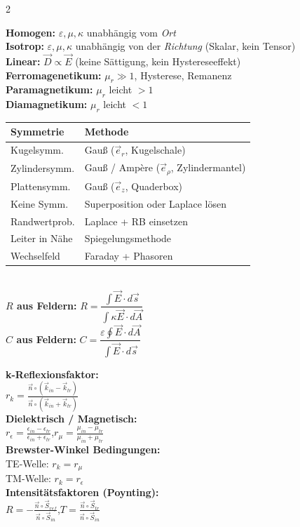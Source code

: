\documentclass[a4paper, 7.5pt]{extarticle}
\begin{document}
\begin{multicols*}{2}
\begin{tcolorbox}[title={Materialeigenschaften -- Definitionen}]
\textbf{Homogen:} $\varepsilon, \mu, \kappa$ unabhängig vom \textit{Ort}\\
\textbf{Isotrop:} $\varepsilon, \mu, \kappa$ unabhängig von der \textit{Richtung} (Skalar, kein Tensor)\\
\textbf{Linear:} $\vec{D}\propto\vec{E}$ (keine Sättigung, kein Hystereseeffekt)\\
\textbf{Ferromagenetikum:} $\mu_r\gg1$, Hysterese, Remanenz\\
\textbf{Paramagnetikum:} $\mu_r$ leicht $>1$\\
\textbf{Diamagnetikum:} $\mu_r$ leicht $<1$
\end{tcolorbox}

\begin{tcolorbox}[title={Lösungsstrategien -- Schnellübersicht}]
\begin{tabular}{@{}ll@{}}
\toprule
Symmetrie & Methode\\
\midrule
Kugelsymm. & Gauß ($\vec{e}_r$, Kugelschale)\\
Zylindersymm. & Gauß / Ampère ($\vec{e}_\rho$, Zylindermantel)\\
Plattensymm. & Gauß ($\vec{e}_z$, Quaderbox)\\
Keine Symm. & Superposition oder Laplace lösen\\
Randwertprob. & Laplace + RB einsetzen\\
Leiter in Nähe & Spiegelungsmethode\\
Wechselfeld & Faraday + Phasoren\\
\bottomrule
\end{tabular}\\[3pt]
\textbf{$R$ aus Feldern:}
$R = \dfrac{\int\vec{E}\cdot d\vec{s}}{\int\kappa\vec{E}\cdot d\vec{A}}$\\[3pt]
\textbf{$C$ aus Feldern:}
$C = \dfrac{\varepsilon\oint\vec{E}\cdot d\vec{A}}{\int\vec{E}\cdot d\vec{s}}$
\end{tcolorbox}

\begin{tcolorbox}[title={Reflexion, Transmission und Brewster-Winkel}]
\textbf{k-Reflexionsfaktor:}\\
$r_k = \frac{\vec{n}\circ(\vec{k}_{in}-\vec{k}_{tr})}{\vec{n}\circ(\vec{k}_{in}+\vec{k}_{tr})}$\\
\textbf{Dielektrisch / Magnetisch:}\\
$r_\epsilon = \frac{\epsilon_{in}-\epsilon_{tr}}{\epsilon_{in}+\epsilon_{tr}}$,\quad $r_\mu = \frac{\mu_{in}-\mu_{tr}}{\mu_{in}+\mu_{tr}}$\\[3pt]
\textbf{Brewster-Winkel Bedingungen:}\\
TE-Welle: $r_k = r_\mu$\\
TM-Welle: $r_k = r_\epsilon$\\[3pt]
\textbf{Intensitätsfaktoren (Poynting):}\\
$R = -\frac{\vec{n}\circ\vec{S}_{ref}}{\vec{n}\circ\vec{S}_{in}}$,\quad $T = \frac{\vec{n}\circ\vec{S}_{tr}}{\vec{n}\circ\vec{S}_{in}}$
\end{tcolorbox}


\end{multicols*}
\end{document}
